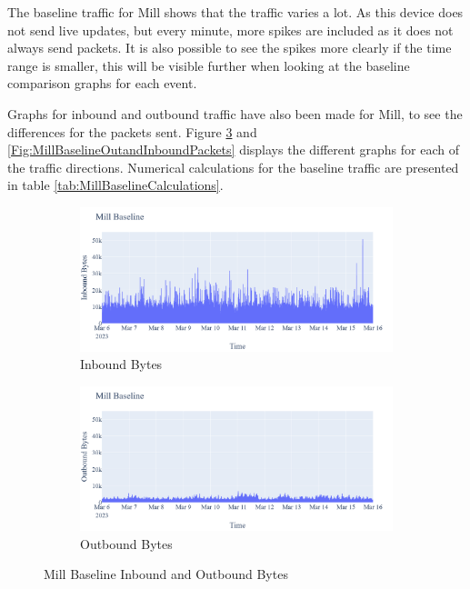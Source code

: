 The baseline traffic for Mill shows that the traffic varies a lot. As this device does not send live updates, but every minute, more spikes are included as it does not always send packets. It is also possible to see the spikes more clearly if the time range is smaller, this will be visible further when looking at the baseline comparison graphs for each event. 

Graphs for inbound and outbound traffic have also been made for Mill, to see the differences for the packets sent. Figure \ref{Fig:MillBaselineOutandInboundBytes} and \ref{Fig:MillBaselineOutandInboundPackets} displays the different graphs for each of the traffic directions. Numerical calculations for the baseline traffic are presented in table \ref{tab:MillBaselineCalculations}. 

\begin{figure}[H]
    \centering
    \begin{subfigure}[b]{0.7\textwidth}
        \includegraphics[width=\textwidth]{figures/Mill_Baseline_InboundBytes.png}
        \caption{Inbound Bytes}
        \label{fig:MillBaselineInboundBytes}
    \end{subfigure}
    \begin{subfigure}[b]{0.7\textwidth}
        \includegraphics[width=\textwidth]{figures/Mill_Baseline_OutboundBytes.png}
        \caption{Outbound Bytes}
        \label{fig:MillBaselineOutboundBytes}
    \end{subfigure}
    \caption{Mill Baseline Inbound and Outbound Bytes}
    \label{Fig:MillBaselineOutandInboundBytes}
 \end{figure}

